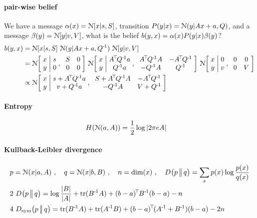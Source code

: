 \paragraph{pair-wise belief} We have a message $\alpha(x)={\cal N}[x|s,S]$,
 transition $P(y|x) = {\cal N}(y|A x+a,Q)$, and a message
 $\beta(y)={\cal N}[y|v,V]$, what is the belief $b(y,x)=\alpha(x)P(y|x)\beta(y)$?
\begin{align}
b(y,x)
 &= \NN[x|s,S]~ \NN(y|A x+a,Q^\1)~ \NN[y|v,V] \\
&=
\NN\bigg[ \arr{c}{x\\ y} \bigg| \arr{c}{s \\ 0} ,~
             \arr{cc}{S & 0 \\ 0 & 0} \bigg]~
\NN\bigg[ \arr{c}{x\\ y} \bigg| \arr{c}{A^\T Q^\1 a \\ Q^\1 a} ,~
             \arr{cc}{A^\T Q^\1 A & -A^\T Q^\1 \\ -Q^\1 A & Q^\1} \bigg]~
\NN\bigg[ \arr{c}{x\\ y} \bigg| \arr{c}{0 \\ v} ,~
             \arr{cc}{0 & 0 \\ 0 & V} \bigg] \\
&\propto
\NN\bigg[ \arr{c}{x\\ y} \bigg| \arr{c}{s + A^\T Q^\1 a\\ v + Q^\1 a} ,~
             \arr{cc}{S + A^\T Q^\1 A & -A^\T Q^\1 \\ -Q^\1 A & V+Q^\1} \bigg]
\end{align}

\paragraph{Entropy}
\begin{align}
H({\cal N}(a,A)) &= \frac{1}{2} \log |2\pi e A|
\end{align}

\paragraph{Kullback-Leibler divergence}
\begin{align}
&p=\NN(x|a,A) \comma q=\NN(x|b,B) \comma n = \text{dim}(x)
 \comma \kld{p}{q} = \sum_x p(x) \log\frac{p(x)}{q(x)} \\
&2~ \kld{p}{q}
= \log\frac{|B|}{|A|} + \tr(B^\1A) + (b-a)^\T B^\1 (b-a) - n \\
&4~ \kld[\text{sym}]{p}{q}
= \tr(B^\1A) + \tr(A^\1B) + (b-a)^\T (A^\1+B^\1) (b-a) - 2n
\end{align}

